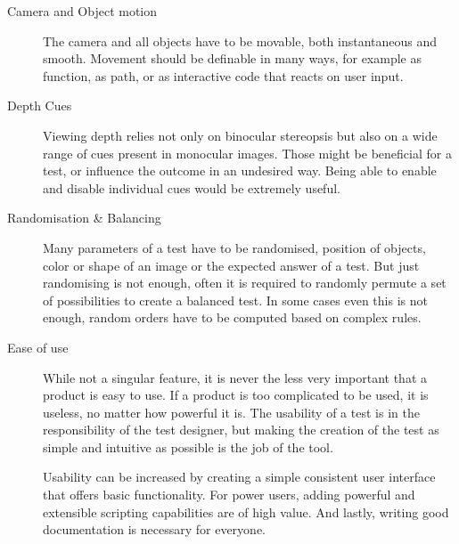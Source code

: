 \begin{description}
\item[Camera and Object motion]
The camera and all objects have to be movable, both instantaneous and smooth.
Movement should be definable in many ways, for example as function, as path, or as interactive code that reacts on user input.

\item[Depth Cues]
Viewing depth relies not only on binocular stereopsis but also on a wide range of cues present in monocular images.
Those might be beneficial for a test, or influence the outcome in an undesired way.
Being able to enable and disable individual cues would be extremely useful.

\item[Randomisation \& Balancing]
Many parameters of a test have to be randomised, position of objects, color or shape of an image or the expected answer of a test.
But just randomising is not enough, often it is required to randomly permute a set of possibilities to create a balanced test.
In some cases even this is not enough, random orders have to be computed based on complex rules.

\item[Ease of use]
While not a singular feature, it is never the less very important that a product is easy to use.
If a product is too complicated to be used, it is useless, no matter how powerful it is.
The usability of a test is in the responsibility of the test designer, but making the creation of the test as simple and intuitive as possible is the job of the tool.

Usability can be increased by creating a simple consistent user interface that offers basic functionality.
For power users, adding powerful and extensible scripting capabilities are of high value.
And lastly, writing good documentation is necessary for everyone.

\end{description}
